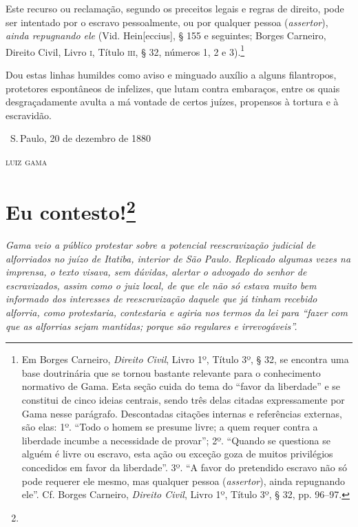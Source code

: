 Este recurso ou reclamação, segundo os preceitos legais e regras de
direito, pode ser intentado por o escravo pessoalmente, ou por qualquer
pessoa (\emph{assertor}), \emph{ainda repugnando ele} (Vid.
Hein{[}eccius{]}, § 155 e seguintes; Borges Carneiro, Direito Civil,
Livro \textsc{i}, Título \textsc{iii}, § 32, números 1, 2 e 3).\footnote{Em Borges
  Carneiro, \emph{Direito Civil}, Livro 1º, Título 3º, § 32, se encontra
  uma base doutrinária que se tornou bastante relevante para o
  conhecimento normativo de Gama. Esta seção cuida do tema do ``favor da
  liberdade'' e se constitui de cinco ideias centrais, sendo três delas
  citadas expressamente por Gama nesse parágrafo. Descontadas citações
  internas e referências externas, são elas: 1º. ``Todo o homem se
  presume livre; a quem requer contra a liberdade incumbe a necessidade
  de provar''; 2º. ``Quando se questiona se alguém é livre ou
  escravo, esta ação ou exceção goza de muitos privilégios concedidos em
  favor da liberdade''. 3º. ``A favor do pretendido escravo não só pode
  requerer ele mesmo, mas qualquer pessoa (\emph{assertor}), ainda
  repugnando ele''. Cf. Borges Carneiro, \emph{Direito Civil}, Livro 1º,
  Título 3º, § 32, pp. 96--97.}

Dou estas linhas humildes
como aviso e minguado auxílio a alguns filantropos, protetores
espontâneos de infelizes, que lutam contra embaraços, entre os quais
desgraçadamente avulta a má vontade de certos juízes, propensos à
tortura e à escravidão.

\bigskip

\hfill\ S.\,Paulo, 20 de dezembro de 1880\smallskip

\hfill\textsc{luiz gama}

\chapter{Eu contesto!\footnote[*]{}}

\begin{flushleft}
{\footnotesize\itshape
Gama veio a público protestar sobre a potencial reescravização
judicial de alforriados no juízo de Itatiba, interior de São Paulo.
Replicado algumas vezes na imprensa, o texto visava, sem dúvidas,
alertar o advogado do senhor de escravizados, assim como o juiz local,
de que ele não só estava muito bem informado dos interesses de
reescravização daquele que já tinham recebido alforria, como
protestaria, contestaria e agiria nos termos da lei para ``fazer com que
as alforrias sejam mantidas; porque são regulares e irrevogáveis''. }
\end{flushleft}


